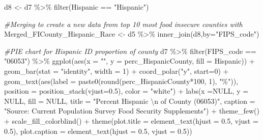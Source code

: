 \documentclass[
]{article}
\newenvironment{Shaded}{\begin{snugshade}}{\end{snugshade}}
\newcommand{\AttributeTok}[1]{\textcolor[rgb]{0.77,0.63,0.00}{#1}}
\newcommand{\CommentTok}[1]{\textcolor[rgb]{0.56,0.35,0.01}{\textit{#1}}}
\newcommand{\ConstantTok}[1]{\textcolor[rgb]{0.00,0.00,0.00}{#1}}
\newcommand{\DecValTok}[1]{\textcolor[rgb]{0.00,0.00,0.81}{#1}}
\newcommand{\FloatTok}[1]{\textcolor[rgb]{0.00,0.00,0.81}{#1}}
\newcommand{\FunctionTok}[1]{\textcolor[rgb]{0.00,0.00,0.00}{#1}}
\newcommand{\NormalTok}[1]{#1}
\newcommand{\OtherTok}[1]{\textcolor[rgb]{0.56,0.35,0.01}{#1}}
\newcommand{\SpecialCharTok}[1]{\textcolor[rgb]{0.00,0.00,0.00}{#1}}
\newcommand{\StringTok}[1]{\textcolor[rgb]{0.31,0.60,0.02}{#1}}
\begin{document}
\begin{Shaded}
\begin{Highlighting}[]
\NormalTok{d8 }\OtherTok{\textless{}{-}}\NormalTok{ d7 }\SpecialCharTok{\%\textgreater{}\%} \FunctionTok{filter}\NormalTok{(Hispanic }\SpecialCharTok{==} \StringTok{"Hispanic"}\NormalTok{)}

\CommentTok{\#Merging to create a new data from top 10 most food insecure counties with }
\NormalTok{Merged\_FICounty\_Hispanic\_Race }\OtherTok{\textless{}{-}}\NormalTok{ d5 }\SpecialCharTok{\%\textgreater{}\%} \FunctionTok{inner\_join}\NormalTok{(d8,}\AttributeTok{by=}\StringTok{"FIPS\_code"}\NormalTok{)}

\CommentTok{\#PIE chart for Hispanic ID proportion of county}
\NormalTok{d7 }\SpecialCharTok{\%\textgreater{}\%}  \FunctionTok{filter}\NormalTok{(FIPS\_code }\SpecialCharTok{==} \StringTok{"06053"}\NormalTok{) }\SpecialCharTok{\%\textgreater{}\%} \FunctionTok{ggplot}\NormalTok{(}\FunctionTok{aes}\NormalTok{(}\AttributeTok{x =} \StringTok{""}\NormalTok{, }\AttributeTok{y =}\NormalTok{ perc\_HispanicCounty, }\AttributeTok{fill =}\NormalTok{ Hispanic)) }\SpecialCharTok{+}
  \FunctionTok{geom\_bar}\NormalTok{(}\AttributeTok{stat =} \StringTok{"identity"}\NormalTok{, }\AttributeTok{width =} \DecValTok{1}\NormalTok{) }\SpecialCharTok{+}
  \FunctionTok{coord\_polar}\NormalTok{(}\StringTok{"y"}\NormalTok{, }\AttributeTok{start=}\DecValTok{0}\NormalTok{) }\SpecialCharTok{+} 
  \FunctionTok{geom\_text}\NormalTok{(}\FunctionTok{aes}\NormalTok{(}\AttributeTok{label =} \FunctionTok{paste0}\NormalTok{(}\FunctionTok{round}\NormalTok{(perc\_HispanicCounty}\SpecialCharTok{*}\DecValTok{100}\NormalTok{, }\DecValTok{1}\NormalTok{), }\StringTok{"\%"}\NormalTok{)), }\AttributeTok{position =} \FunctionTok{position\_stack}\NormalTok{(}\AttributeTok{vjust=}\FloatTok{0.5}\NormalTok{), }\AttributeTok{color =} \StringTok{"white"}\NormalTok{) }\SpecialCharTok{+} 
  \FunctionTok{labs}\NormalTok{(}\AttributeTok{x =}\ConstantTok{NULL}\NormalTok{, }\AttributeTok{y =} \ConstantTok{NULL}\NormalTok{, }\AttributeTok{fill =} \ConstantTok{NULL}\NormalTok{,}
    \AttributeTok{title =} \StringTok{"Percent Hispanic }\SpecialCharTok{\textbackslash{}n}\StringTok{ of County (06053)"}\NormalTok{,}
    \AttributeTok{caption =} \StringTok{"Source: Current Population Survey Food Security Supplements"}\NormalTok{) }\SpecialCharTok{+}
  \FunctionTok{theme\_few}\NormalTok{() }\SpecialCharTok{+}
  \FunctionTok{scale\_fill\_colorblind}\NormalTok{() }\SpecialCharTok{+}
  \FunctionTok{theme}\NormalTok{(}\AttributeTok{plot.title =} \FunctionTok{element\_text}\NormalTok{(}\AttributeTok{hjust =} \FloatTok{0.5}\NormalTok{, }\AttributeTok{vjust =} \FloatTok{0.5}\NormalTok{), }\AttributeTok{plot.caption =} \FunctionTok{element\_text}\NormalTok{(}\AttributeTok{hjust =} \FloatTok{0.5}\NormalTok{, }\AttributeTok{vjust =} \FloatTok{0.5}\NormalTok{))}
\end{Highlighting}
\end{Shaded}
\end{document}

